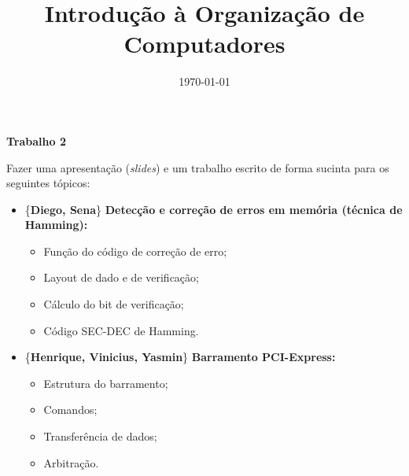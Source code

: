 \documentclass[12pt]{article}
\begin{document}
\title{Introdução à Organização de Computadores}
\author{}
\date{\today}
\maketitle

{\begin{center}\Large \bf Trabalho 2\end{center}}

Fazer uma apresentação ({\it slides}) e um trabalho escrito de forma sucinta para
os seguintes tópicos:

\begin{itemize}
\item \{{\bf Diego, Sena}\} {\bf Detecção e correção de erros em memória (técnica de Hamming):}
  \begin{itemize}
  \item Função do código de correção de erro;
  \item Layout de dado e de verificação;
  \item Cálculo do bit de verificação;
  \item Código SEC-DEC de Hamming.
  \end{itemize}

\item \{{\bf Henrique, Vinicius, Yasmin}\} {\bf Barramento PCI-Express:}
  \begin{itemize}
  \item Estrutura do barramento;
  \item Comandos;
  \item Transferência de dados;
  \item Arbitração.
  \end{itemize}
\end{itemize}
\end{document}
